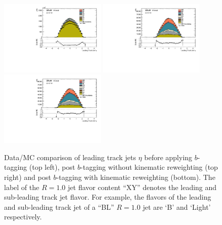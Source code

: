 \begin{figure}[htbp]
  \centering
 \includegraphics[width=0.45\textwidth]{figures/gbb/LeadTrkJet_eta_NoReweight.pdf}
 \includegraphics[width=0.45\textwidth]{figures/gbb/LeadTrkJet_eta_PreReweight.pdf}\\
 \includegraphics[width=0.45\textwidth]{figures/gbb/LeadTrkJet_eta_Reweight.pdf}
\caption{Data/MC comparison of leading track jets $\eta$ before applying $b$-tagging (top left), post $b$-tagging without kinematic reweighting (top right) and post $b$-tagging with kinematic reweighting (bottom). The label of the $R=1.0$ jet flavor content ``XY'' denotes the leading and sub-leading track jet flavor. For example, the flavors of the leading and sub-leading track jet of a ``BL'' $R=1.0$ jet are `B' and `Light' respectively.}
  \label{fig:gbb-eta_leadtrkjets}
\end{figure}


